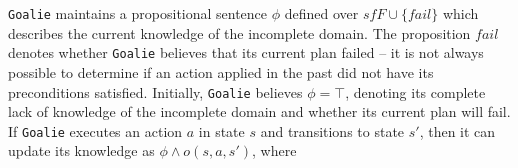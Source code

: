 \documentclass[letterpaper]{article}
\newenvironment{packed_itemize}{
\begin{itemize}
  \setlength{\itemsep}{1pt}
  \setlength{\parskip}{0pt}
  \setlength{\parsep}{0pt}
}{\end{itemize}}
\def\goalie{{\tt Goalie}}
\begin{document}

\goalie{} maintains a propositional sentence $\phi$ defined over ${sf
F} \cup \{fail\}$ which describes the current knowledge of the
incomplete domain.  The proposition $fail$ denotes whether \goalie{} believes
that its current plan failed -- it is not always possible to determine if an
action applied in the past did not have its preconditions satisfied.  Initially,
\goalie{} believes $\phi = \top$, denoting its complete lack of knowledge of the
incomplete domain and whether its current plan will fail.    If \goalie{}
executes an action $a$ in state $s$ and transitions to state $s'$, then it can
update its knowledge as $\phi \wedge o(s, a, s')$, where
\end{document}
